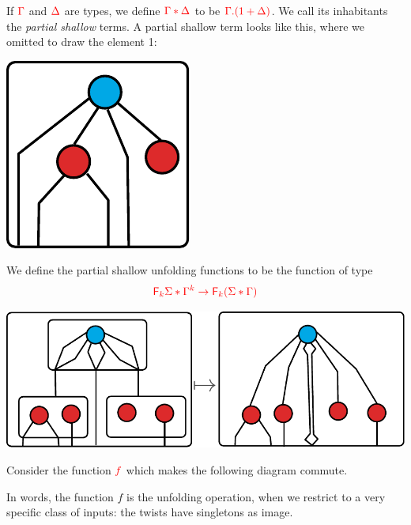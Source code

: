 \noindent\begin{example} If ${\color{red}{\Gamma}}$ and ${\color{red}{\Delta}}$ are types, we define ${\color{red}{\Gamma*\Delta}}$ to be ${\color{red}{\Gamma.(1+\Delta)}}$. We call its inhabitants the \emph{partial shallow} terms. A partial shallow term looks like this, where we omitted to draw the element 1:
\begin{center}
\includegraphics[scale=.4]{partial-shallow-term.pdf}
\end{center}
We define the partial shallow unfolding functions to be the function of type
\begin{align*}
{\color{red}{{{\color{red}{\mathsf F_{k}}}\Sigma}*{\Gamma^k} \to {\color{red}{\mathsf F_{k}}}({\Sigma}*{\Gamma})}} 
\end{align*}
 \begin{center}
\includegraphics[scale=.4]{partial-shallow-unfold.pdf}
 \end{center}
\end{example}

\noindent\begin{example} Consider the function ${\color{red}{f}}$ which makes the following diagram commute.
 \begin{center}
 \end{center}
 In words, the function $f$ is the unfolding operation, when we restrict to a very specific class of inputs: the twists have singletons as image. 
\end{example}
